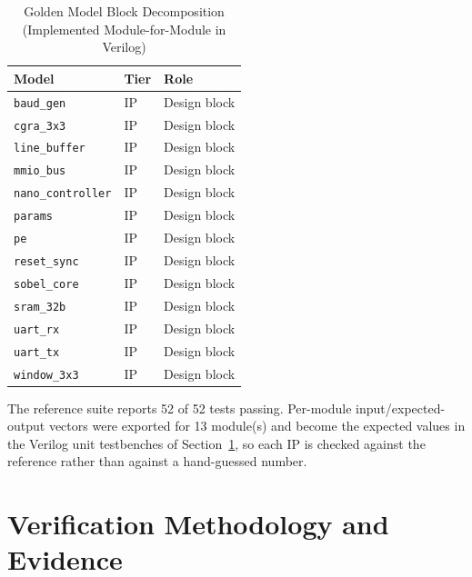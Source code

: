 \documentclass{ieeeaccess}
\begin{document}
\begin{table}[!t]
\caption{Golden Model Block Decomposition (Implemented Module-for-Module in Verilog)}
\label{tab:golden}
\setlength{\tabcolsep}{3pt}
\footnotesize
\centering
\begin{tabular}{|>{\raggedright\arraybackslash}p{}|>{\raggedright\arraybackslash}p{}|>{\raggedright\arraybackslash}p{}|}
\hline
Model & Tier & Role \\
\hline
\texttt{baud\_\allowbreak{}gen} & IP & Design block \\
\texttt{cgra\_\allowbreak{}3x3} & IP & Design block \\
\texttt{line\_\allowbreak{}buffer} & IP & Design block \\
\texttt{mmio\_\allowbreak{}bus} & IP & Design block \\
\texttt{nano\_\allowbreak{}controller} & IP & Design block \\
\texttt{params} & IP & Design block \\
\texttt{pe} & IP & Design block \\
\texttt{reset\_\allowbreak{}sync} & IP & Design block \\
\texttt{sobel\_\allowbreak{}core} & IP & Design block \\
\texttt{sram\_\allowbreak{}32b} & IP & Design block \\
\texttt{uart\_\allowbreak{}rx} & IP & Design block \\
\texttt{uart\_\allowbreak{}tx} & IP & Design block \\
\texttt{window\_\allowbreak{}3x3} & IP & Design block \\
\hline
\end{tabular}
\end{table}

The reference suite reports 52 of 52 tests passing. Per-module input/expected-output vectors were exported for 13 module(s) and become the expected values in the Verilog unit testbenches of Section~\ref{sec:verif}, so each IP is checked against the reference rather than against a hand-guessed number.

\section{Verification Methodology and Evidence}
\label{sec:verif}
\end{document}
